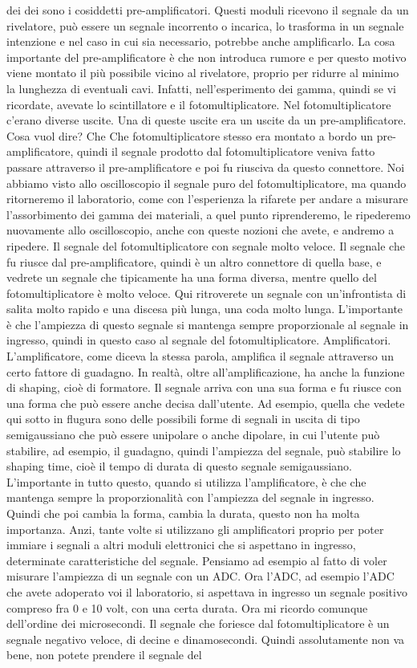 dei dei sono i cosiddetti pre-amplificatori. Questi moduli ricevono il segnale da un rivelatore, può essere un segnale incorrento o incarica, lo trasforma in un segnale intenzione e nel caso in cui sia necessario, potrebbe anche amplificarlo. La cosa importante del pre-amplificatore è che non introduca rumore e per questo motivo viene montato il più possibile vicino al rivelatore, proprio per ridurre al minimo la lunghezza di eventuali cavi. Infatti, nell'esperimento dei gamma, quindi se vi ricordate, avevate lo scintillatore e il fotomultiplicatore. Nel fotomultiplicatore c'erano diverse uscite. Una di queste uscite era un uscite da un pre-amplificatore. Cosa vuol dire? Che Che fotomultiplicatore stesso era montato a bordo un pre-amplificatore, quindi il segnale prodotto dal fotomultiplicatore veniva fatto passare attraverso il pre-amplificatore e poi fu riusciva da questo connettore. Noi abbiamo visto allo oscilloscopio il segnale puro del fotomultiplicatore, ma quando ritorneremo il laboratorio, come con l'esperienza la rifarete per andare a misurare l'assorbimento dei gamma dei materiali, a quel punto riprenderemo, le ripederemo nuovamente allo oscilloscopio, anche con queste nozioni che avete, e andremo a ripedere. Il segnale del fotomultiplicatore con segnale molto veloce. Il segnale che fu riusce dal pre-amplificatore, quindi è un altro connettore di quella base, e vedrete un segnale che tipicamente ha una forma diversa, mentre quello del fotomultiplicatore è molto veloce. Qui ritroverete un segnale con un'infrontista di salita molto rapido e una discesa più lunga, una coda molto lunga. L'importante è che l'ampiezza di questo segnale si mantenga sempre proporzionale al segnale in ingresso, quindi in questo caso al segnale del fotomultiplicatore. Amplificatori. L'amplificatore, come diceva la stessa parola, amplifica il segnale attraverso un certo fattore di guadagno. In realtà, oltre all'amplificazione, ha anche la funzione di shaping, cioè di formatore. Il segnale arriva con una sua forma e fu riusce con una forma che può essere anche decisa dall'utente. Ad esempio, quella che vedete qui sotto in flugura sono delle possibili forme di segnali in uscita di tipo semigaussiano che può essere unipolare o anche dipolare, in cui l'utente può stabilire, ad esempio, il guadagno, quindi l'ampiezza del segnale, può stabilire lo shaping time, cioè il tempo di durata di questo segnale semigaussiano. L'importante in tutto questo, quando si utilizza l'amplificatore, è che che mantenga sempre la proporzionalità con l'ampiezza del segnale in ingresso. Quindi che poi cambia la forma, cambia la durata, questo non ha molta importanza. Anzi, tante volte si utilizzano gli amplificatori proprio per poter immiare i segnali a altri moduli elettronici che si aspettano in ingresso, determinate caratteristiche del segnale. Pensiamo ad esempio al fatto di voler misurare l'ampiezza di un segnale con un ADC. Ora l'ADC, ad esempio l'ADC che avete adoperato voi il laboratorio, si aspettava in ingresso un segnale positivo compreso fra 0 e 10 volt, con una certa durata. Ora mi ricordo comunque dell'ordine dei microsecondi. Il segnale che foriesce dal fotomultiplicatore è un segnale negativo veloce, di decine e dinamosecondi. Quindi assolutamente non va bene, non potete prendere il segnale del 